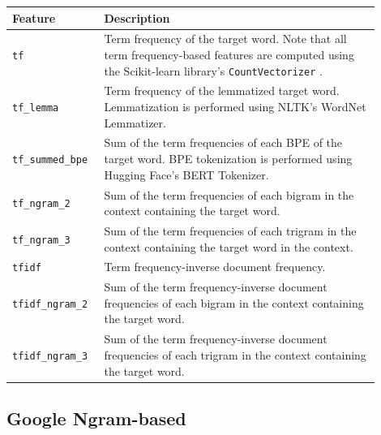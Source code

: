 \documentclass{dcthesis}
\theoremstyle{definition}
\theoremstyle{remark}
\begin{document}
\begin{table}[H]
  \centering
  \begin{tabular}{>{\centering\arraybackslash}p{0.2\linewidth}>{\arraybackslash}p{0.7\linewidth}}
    \hline \textbf{Feature} & \textbf{Description} \\ \hline
    \texttt{tf} & Term frequency of the target word. Note that all term frequency-based features are computed using the Scikit-learn library's \texttt{CountVectorizer} \citep{scikitlearn}.\\
    \hline 
    \texttt{tf\_lemma} & Term frequency of the lemmatized target word. Lemmatization is performed using NLTK's WordNet Lemmatizer.\\
    \hline 
    \texttt{tf\_summed\_bpe} & Sum of the term frequencies of each BPE of the target word. BPE tokenization is performed using Hugging Face's BERT Tokenizer.\\
    \hline 
    \texttt{tf\_ngram\_2} & Sum of the term frequencies of each bigram in the context containing the target word.\\
    \hline 
    \texttt{tf\_ngram\_3} & Sum of the term frequencies of each trigram in the context containing the target word in the context.\\
    \hline 
    \texttt{tfidf} & Term frequency-inverse document frequency.\\
    \hline 
    \texttt{tfidf\_ngram\_2} & Sum of the term frequency-inverse document frequencies of each bigram in the context containing the target word.\\
    \hline 
    \texttt{tfidf\_ngram\_3} & Sum of the term frequency-inverse document frequencies of each trigram in the context containing the target word.\\
    \hline
  \end{tabular}
  \label{word_frequency_and_n_gram_features_gigaword_based}
\end{table}

\subsection{Google Ngram-based}
\end{document}
